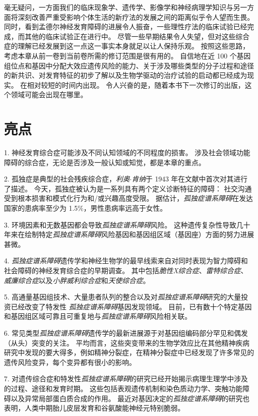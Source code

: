 毫无疑问，一方面我们的临床现象学、遗传学、影像学和神经病理学知识与另一方面将深刻改善严重受影响个体生活的新疗法的发展之间的距离似乎令人望而生畏。
同时，看到孟德尔神经发育障碍的进展令人振奋，一些理性疗法的临床试验已经完成，而其他的临床试验正在进行中。
尽管一些早期结果令人失望，但对这些综合症的理解已经发展到这一点这一事实本身就足以让人保持乐观。
按照这些思路，考虑本章从前一卷到当前卷所需的修订范围是很有用的。
自信地在近 100 个基因组位点和基因中分配大效应遗传风险的能力、关于涉及哪些类型的分子过程和途径的新共识、对发育特征的初步了解以及生物学驱动的治疗试验的启动都已经成为现实。
在相对较短的时间内出现。
令人兴奋的是，随着本书下一次修订的出版，这个领域可能会出现在哪里。



\section{亮点}

1. 神经发育综合症可能涉及不同认知领域的不同程度的损害。
涉及社会领域功能障碍的综合症，无论是否涉及一般认知或知觉，都是本章的重点。


2. 孤独症是典型的社会残疾综合症，\textit{利奥$\cdot$肯纳}于 1943 年在文献中首次对其进行了描述。
今天，孤独症被认为是一系列具有两个定义诊断特征的障碍：
社交沟通受到根本损害和模式化行为和/或兴趣高度受限。
据估计，\textit{孤独症谱系障碍}在发达国家的患病率至少为 1.5\%，男性患病率远高于女性。


3. 环境因素和无数基因都会导致\textit{孤独症谱系障碍}风险。
这种遗传复杂性导致几十年来在绘制特定\textit{孤独症谱系障碍}风险基因和基因组区域（基因座）方面的努力进展甚微。


4. \textit{孤独症谱系障碍}遗传学和神经生物学的最早线索来自对同时表现为智力障碍和社会障碍的神经发育综合症的早期调查。
其中包括\textit{脆性X综合症}、\textit{雷特综合症}、\textit{威廉综合症}以及\textit{小胖威利综合症}和\textit{天使综合症}。 


5. 高通量基因组技术、大量患者队列的整合以及对\textit{孤独症谱系障碍}研究的大量投资已经改变了特发性 \textit{孤独症谱系障碍}基因发现领域。
目前，已有数十个特定基因和基因组区域可靠且可重复地与\textit{孤独症谱系障碍}风险相关联。 


6. 常见类型\textit{孤独症谱系障碍}遗传学的最新进展源于对基因组编码部分罕见和偶发（从头）突变的关注。
平均而言，这些突变带来的生物学效应比在其他精神疾病研究中发现的要大得多，例如精神分裂症，在精神分裂症中已经发现了许多常见的遗传风险变异，每个变异都有很小的影响。


7. 对遗传综合症和特发性\textit{孤独症谱系障碍}的研究已经开始揭示病理生理学中涉及的过程、途径和发育时期。
这些包括表观遗传机制和染色质动力学、突触功能障碍以及异常局部蛋白质合成的作用。
最近对基因决定的\textit{孤独症谱系障碍}的研究也表明，人类中期胎儿皮层发育和谷氨酸能神经元特别脆弱。


